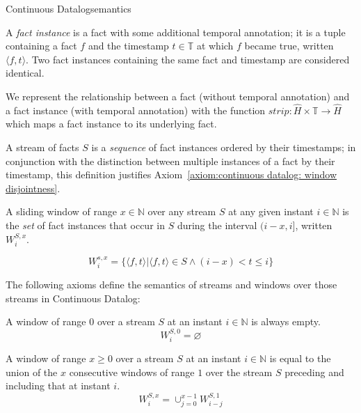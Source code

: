 \begin{nestedsection}{Continuous Datalog}{semantics}
\begin{definition}
A {\em fact instance} is a fact with some additional temporal
annotation; it is a tuple containing a fact $f$ and the timestamp
$t \in \mathbb{T}$ at which $f$ became true, written
$\langle f, t \rangle$. Two fact instances containing the same fact
and timestamp are considered identical.

We represent the relationship between a fact (without temporal
annotation) and a fact instance (with temporal annotation) with the
function ${strip : \hat{H} \times \mathbb{T} \rightarrow \hat{H}}$
which maps a fact instance to its underlying fact.
\end{definition}

\begin{definition}
A stream of facts $S$ is a \emph{sequence} of fact instances ordered
by their timestamps; in conjunction with the distinction between
multiple instances of a fact by their timestamp, this definition justifies
Axiom~\ref{axiom:continuous datalog: window disjointness}.
\end{definition}

\begin{definition}

A sliding window of range ${x \in \mathbb{N}}$ over any stream $S$ at
any given instant ${i \in \mathbb{N}}$ is the \emph{set} of fact
instances that occur in $S$ during the interval ${(i-x,i]}$, written
${W^{S,x}_{i}}$.

\[ W^{s,x}_i = \{ \langle f, t \rangle | \langle f, t \rangle \in S \land (i-x) < t \leqslant i \}\]  

\end{definition}

The following axioms define the semantics of streams and windows over
those streams in Continuous Datalog:

\begin{axiom}\label{axiom:continuous datalog: window range leq 0}
A window of range $0$ over a stream $S$ at an instant 
${i \in \mathbb{N}}$ is always empty.
\begin{equation*}
W^{S,0}_{i} = \varnothing
\end{equation*}
\end{axiom}

\begin{axiom}\label{axiom:continuous datalog: window composition}
A window of range ${x \ge 0}$ over a stream $S$ at an instant 
${i \in \mathbb{N}}$ is equal to the union of the $x$ consecutive
windows of range $1$ over the stream $S$ preceding and including that at
instant $i$.
\begin{equation*}
W^{S,x}_{i} = \mathop{\cup}_{j=0}^{x-1} W^{S,1}_{i-j}
\end{equation*}
\end{axiom}


\end{nestedsection}
